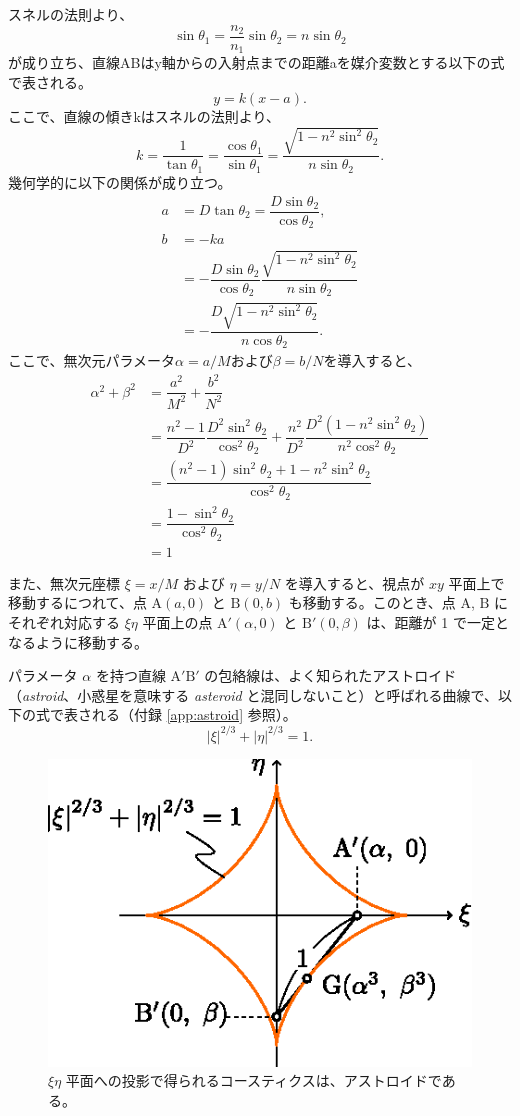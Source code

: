 \documentclass[twocolumn]{article}
\begin{document}
スネルの法則より、
$$ \sin\theta_1 = \frac{n_2}{n_1} \sin\theta_2 = n\sin\theta_2$$
が成り立ち、直線ABはy軸からの入射点までの距離aを媒介変数とする以下の式で表される。
$$y=k(x-a).$$
ここで、直線の傾きkはスネルの法則より、
$$k=\dfrac{1}{\tan\theta_1}=\dfrac{\cos\theta_1}{\sin\theta_1}
=\dfrac{\sqrt{1-n^2\sin^2\theta_2}}{n\sin\theta_2}.$$
幾何学的に以下の関係が成り立つ。
$$\begin{aligned}
	a &= D\tan\theta_2 = \dfrac{D\sin\theta_2}{\cos\theta_2},\\
	b &= -ka \\
	&= -\dfrac{D\sin\theta_2}{\cos\theta_2}
	\dfrac{\sqrt{1-n^2\sin^2\theta_2}}{n\sin\theta_2}\\
	&=-\dfrac{D\sqrt{1-n^2\sin^2\theta_2}}{n\cos\theta_2}.
\end{aligned}$$
ここで、無次元パラメータ$\alpha=a/M$および$\beta=b/N$を導入すると、
$$ \begin{aligned}
	\alpha^2 + \beta^2 &= \dfrac{a^2}{M^2}+\dfrac{b^2}{N^2}\\
	&=\dfrac{n^2-1}{D^2}\dfrac{D^2\sin^2\theta_2}{\cos^2\theta_2}%
	+\dfrac{n^2}{D^2}\dfrac{D^2(1-n^2\sin^2\theta_2)}{n^2\cos^2\theta_2}\\
	&=\dfrac{\left(n^2-1\right)\sin^2\theta_2 + 1-n^2\sin^2\theta_2}
	{\cos^2\theta_2}\\
	&=\dfrac{1-\sin^2\theta_2}{\cos^2\theta_2}\\
	&= 1
\end{aligned}$$
	
また、無次元座標 $\xi=x/M$ および $\eta=y/N$ を導入すると、視点が $xy$ 平面上で移動するにつれて、点 $\mathrm{A}(a, 0)$ と $\mathrm{B}(0, b)$ も移動する。このとき、点 $\mathrm{A}$, $\mathrm{B}$ にそれぞれ対応する $\xi\eta$ 平面上の点 $\mathrm{A'}(\alpha, 0)$ と $\mathrm{B'}(0, \beta)$ は、距離が 1 で一定となるように移動する。

パラメータ $\alpha$ を持つ直線 ${\mathrm{A'B'}}$ の包絡線は、よく知られたアストロイド（\emph{astroid}、小惑星を意味する \emph{asteroid} と混同しないこと）と呼ばれる曲線で、以下の式で表される（付録 \ref{app:astroid} 参照）。
$$ \left| \xi \right|^{2/3} + \left| \eta \right|^{2/3} = 1. $$

\begin{figure}
	\centering
	\includegraphics{figs/g107.eps}
	\caption{$\xi\eta$ 平面への投影で得られるコースティクスは、アストロイドである。}
	\label{fig:astroid}
\end{figure}
\end{document}
